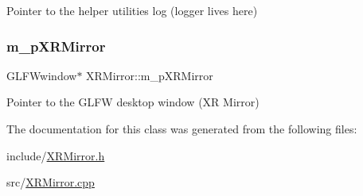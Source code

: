 Pointer to the helper utilities log (logger lives here) 

\mbox{\label{class_x_r_mirror_aa61d4a6537d0b5f41c24b831090075bd}} 
\subsubsection{\texorpdfstring{m\_pXRMirror}{m\_pXRMirror}}
{\footnotesize\ttfamily G\+L\+F\+Wwindow$\ast$ X\+R\+Mirror\+::m\+\_\+p\+X\+R\+Mirror\hspace{0.3cm}{\ttfamily [private]}}



Pointer to the G\+L\+FW desktop window (XR Mirror) 



The documentation for this class was generated from the following files\+:\begin{DoxyCompactItemize}
\item 
include/\mbox{\hyperlink{_x_r_mirror_8h}{X\+R\+Mirror.\+h}}\item 
src/\mbox{\hyperlink{_x_r_mirror_8cpp}{X\+R\+Mirror.\+cpp}}\end{DoxyCompactItemize}
